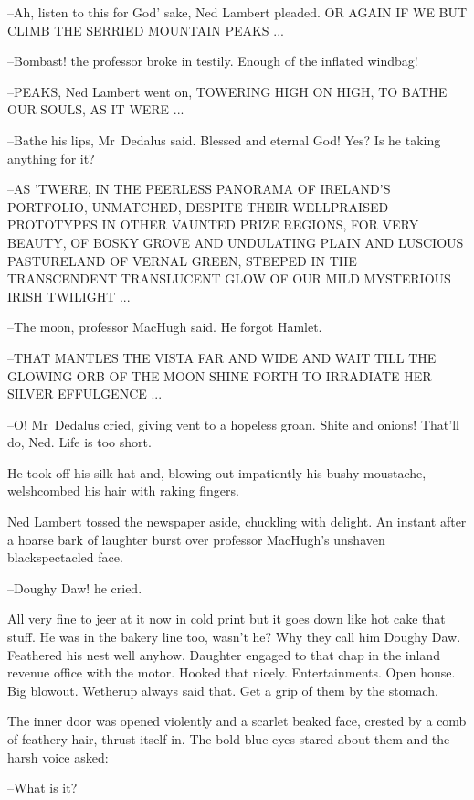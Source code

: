 --Ah, listen to this for God' sake,
Ned Lambert pleaded.
OR AGAIN IF WE BUT CLIMB THE SERRIED MOUNTAIN PEAKS ...

--Bombast!
the professor broke in testily.
Enough of the inflated windbag!

--PEAKS,
Ned Lambert went on,
TOWERING HIGH ON HIGH,
TO BATHE OUR SOULS,
AS IT WERE ...

--Bathe his lips,
Mr~Dedalus said.
Blessed and eternal God!
Yes?
Is he taking anything for it?

--AS 'TWERE,
IN THE PEERLESS PANORAMA OF IRELAND'S PORTFOLIO,
UNMATCHED,
DESPITE THEIR WELLPRAISED PROTOTYPES IN OTHER VAUNTED PRIZE REGIONS,
FOR VERY BEAUTY,
OF BOSKY GROVE AND UNDULATING PLAIN AND LUSCIOUS PASTURELAND OF VERNAL GREEN,
STEEPED IN THE TRANSCENDENT TRANSLUCENT GLOW OF OUR MILD MYSTERIOUS IRISH TWILIGHT ...



--The moon,
professor MacHugh said.
He forgot Hamlet.

--THAT MANTLES THE VISTA FAR AND WIDE
AND WAIT TILL THE GLOWING ORB OF THE MOON SHINE FORTH
TO IRRADIATE HER SILVER EFFULGENCE ...

--O!
Mr~Dedalus cried,
giving vent to a hopeless groan.
Shite and onions!
That'll do, Ned.
Life is too short.

He took off his silk hat
and, blowing out impatiently his bushy moustache,
welshcombed his hair with raking fingers.

Ned Lambert tossed the newspaper aside,
chuckling with delight.
An instant after a hoarse bark of laughter
burst over professor MacHugh's unshaven blackspectacled face.

--Doughy Daw!
he cried.



All very fine to jeer at it now in cold print
but it goes down like hot cake that stuff.
He was in the bakery line too, wasn't he?
Why they call him Doughy Daw.
Feathered his nest well anyhow.
Daughter engaged to that chap in the inland revenue office with the motor.
Hooked that nicely.
Entertainments.
Open house.
Big blowout.
Wetherup always said that.
Get a grip of them by the stomach.

The inner door was opened violently
and a scarlet beaked face,
crested by a comb of feathery hair,
thrust itself in.
The bold blue eyes stared about them
and the harsh voice asked:

--What is it?

